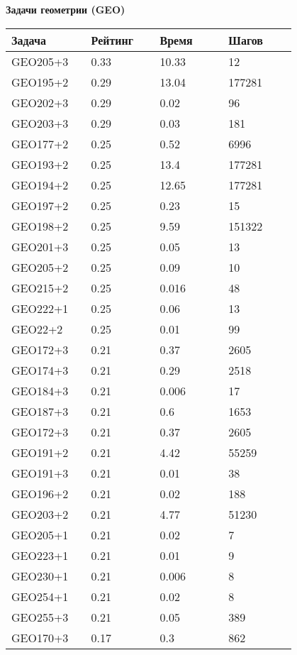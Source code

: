 \textbf{Задачи геометрии (GEO)}
 
\begin{longtable}[H]{|p{0.2\linewidth}|p{0.2\linewidth}|p{0.2\linewidth}|p{0.2\linewidth}|}
\hline
\textbf{Задача} & \textbf{Рейтинг} & \textbf{Время} & \textbf{Шагов} \\
\hline
GEO205+3 & 0.33 & 10.33 & 12 \\
\hline
GEO195+2 & 0.29 & 13.04 & 177281 \\
\hline
GEO202+3 & 0.29 & 0.02 & 96 \\
\hline
GEO203+3 & 0.29 & 0.03 & 181 \\
\hline
GEO177+2 & 0.25 & 0.52 & 6996 \\
\hline
GEO193+2 & 0.25 & 13.4 & 177281 \\
\hline
GEO194+2 & 0.25 & 12.65 & 177281 \\
\hline
GEO197+2 & 0.25 & 0.23 & 15 \\
\hline
GEO198+2 & 0.25 & 9.59 & 151322 \\
\hline
GEO201+3 & 0.25 & 0.05 & 13 \\
\hline
GEO205+2 & 0.25 & 0.09 & 10 \\
\hline
GEO215+2 & 0.25 & 0.016 & 48 \\
\hline
GEO222+1 & 0.25 & 0.06 & 13 \\
\hline
GEO22+2 & 0.25 & 0.01 & 99 \\
\hline
GEO172+3 & 0.21 & 0.37 & 2605 \\
\hline
GEO174+3 & 0.21 & 0.29 & 2518 \\
\hline
GEO184+3 & 0.21 & 0.006 & 17 \\
\hline
GEO187+3 & 0.21 & 0.6 & 1653 \\
\hline
GEO172+3 & 0.21 & 0.37 & 2605 \\
\hline
GEO191+2 & 0.21 & 4.42 & 55259 \\
\hline
GEO191+3 & 0.21 & 0.01 & 38 \\
\hline
GEO196+2 & 0.21 & 0.02 & 188 \\
\hline
GEO203+2 & 0.21 & 4.77 & 51230 \\
\hline
GEO205+1 & 0.21 & 0.02 & 7 \\
\hline
GEO223+1 & 0.21 & 0.01 & 9 \\
\hline
GEO230+1 & 0.21 & 0.006 & 8 \\
\hline
GEO254+1 & 0.21 & 0.02 & 8 \\
\hline
GEO255+3 & 0.21 & 0.05 & 389 \\
\hline
GEO170+3 & 0.17 & 0.3 & 862 \\

\end{longtable}
